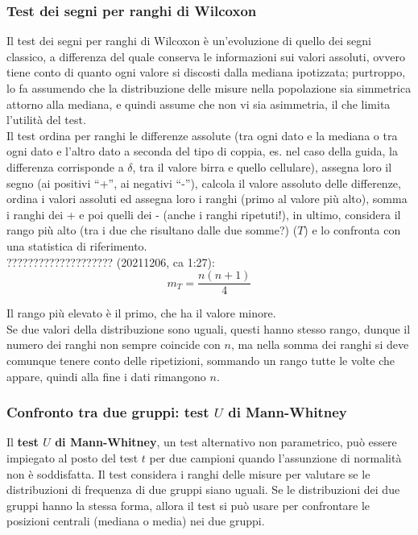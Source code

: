 \documentclass[10pt, draft]{book}
\begin{document}
\subsubsection{Test dei segni per ranghi di Wilcoxon}

Il test dei segni per ranghi di Wilcoxon è un'evoluzione di quello dei segni classico, a differenza del quale conserva le informazioni sui valori assoluti, ovvero tiene conto di quanto ogni valore si discosti dalla mediana ipotizzata; purtroppo, lo fa assumendo che la distribuzione delle misure nella popolazione sia simmetrica attorno alla mediana, e quindi assume che non vi sia asimmetria, il che limita l'utilità del test.\\
Il test ordina per ranghi le differenze assolute (tra ogni dato e la mediana o tra ogni dato e l'altro dato a seconda del tipo di coppia, es. nel caso della guida, la differenza corrisponde a $\delta$, tra il valore birra e quello cellulare), assegna loro il segno (ai positivi ``+'', ai negativi ``-''), calcola il valore assoluto delle differenze, ordina i valori assoluti ed assegna loro i ranghi (primo al valore più alto), somma i ranghi dei + e poi quelli dei - (anche i ranghi ripetuti!), in ultimo, considera il rango più alto (tra i due che risultano dalle due somme?) ($T$) e lo confronta con una statistica di riferimento.\\
???????????????????? (20211206, ca 1:27):
\begin{equation}
    m_T = \frac{n(n+1)}{4}
\end{equation}

Il rango più elevato è il primo, che ha il valore minore.\\
Se due valori della distribuzione sono uguali, questi hanno stesso rango, dunque il numero dei ranghi non sempre coincide con $n$, ma nella somma dei ranghi si deve comunque tenere conto delle ripetizioni, sommando un rango tutte le volte che appare, quindi alla fine i dati rimangono $n$.\\

\subsubsection{Confronto tra due gruppi: test \texorpdfstring{$U$}{Lg} di Mann-Whitney}

Il \textbf{test $U$ di Mann-Whitney}, un test alternativo non parametrico, può essere impiegato al posto del test $t$ per due campioni quando l'assunzione di normalità non è soddisfatta. Il test considera i ranghi delle misure per valutare se le distribuzioni di frequenza di due gruppi siano uguali. Se le distribuzioni dei due gruppi hanno la stessa forma, allora il test si può usare per confrontare le posizioni centrali (mediana o media) nei due gruppi.
\end{document}

